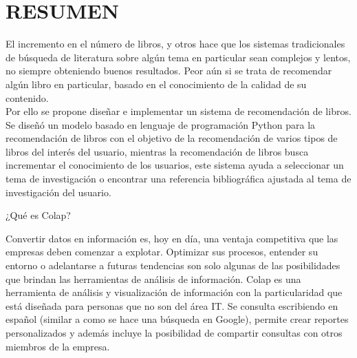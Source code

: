 \section{RESUMEN} 

El incremento en el número de libros, y otros hace que los sistemas tradicionales de búsqueda de literatura sobre algún tema en particular sean complejos y lentos, no siempre obteniendo buenos resultados. Peor aún si se trata de recomendar algún libro en particular, basado en el conocimiento de la calidad de su contenido. 
\\
Por ello se propone diseñar e implementar un sistema de recomendación de libros. Se diseñó un modelo basado en lenguaje de programación Python para la recomendación de libros con el objetivo de la recomendación de varios tipos de libros del interés del usuario, mientras la recomendación de libros busca incrementar el conocimiento de los usuarios, este sistema ayuda a seleccionar un tema de investigación o encontrar una referencia bibliográfica ajustada al tema de investigación del usuario. 


¿Qué es Colap?

Convertir datos en información es, hoy en día, una ventaja competitiva que las empresas deben comenzar a explotar. Optimizar sus procesos, entender su entorno o adelantarse a futuras tendencias son solo algunas de las posibilidades que brindan las herramientas de análisis de información.
Colap es una herramienta de análisis y visualización de información con la particularidad que está diseñada para personas que no son del área IT. Se consulta escribiendo en español (similar a como se hace una búsqueda en Google), permite crear reportes personalizados y además incluye la posibilidad de compartir consultas con otros miembros de la empresa.

